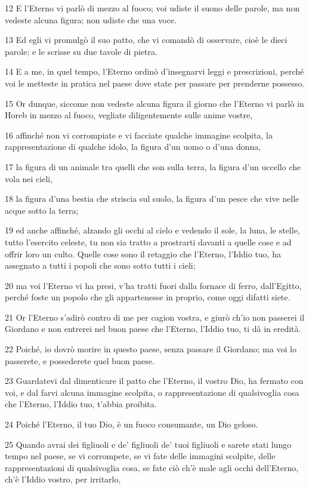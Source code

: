 \par 12 E l'Eterno vi parlò di mezzo al fuoco; voi udiste il suono delle parole, ma non vedeste alcuna figura; non udiste che una voce.
\par 13 Ed egli vi promulgò il suo patto, che vi comandò di osservare, cioè le dieci parole; e le scrisse su due tavole di pietra.
\par 14 E a me, in quel tempo, l'Eterno ordinò d'insegnarvi leggi e prescrizioni, perché voi le metteste in pratica nel paese dove state per passare per prenderne possesso.
\par 15 Or dunque, siccome non vedeste alcuna figura il giorno che l'Eterno vi parlò in Horeb in mezzo al fuoco, vegliate diligentemente sulle anime vostre,
\par 16 affinché non vi corrompiate e vi facciate qualche immagine scolpita, la rappresentazione di qualche idolo, la figura d'un uomo o d'una donna,
\par 17 la figura di un animale tra quelli che son sulla terra, la figura d'un uccello che vola nei cieli,
\par 18 la figura d'una bestia che striscia sul suolo, la figura d'un pesce che vive nelle acque sotto la terra;
\par 19 ed anche affinché, alzando gli occhi al cielo e vedendo il sole, la luna, le stelle, tutto l'esercito celeste, tu non sia tratto a prostrarti davanti a quelle cose e ad offrir loro un culto. Quelle cose sono il retaggio che l'Eterno, l'Iddio tuo, ha assegnato a tutti i popoli che sono sotto tutti i cieli;
\par 20 ma voi l'Eterno vi ha presi, v'ha tratti fuori dalla fornace di ferro, dall'Egitto, perché foste un popolo che gli appartenesse in proprio, come oggi difatti siete.
\par 21 Or l'Eterno s'adirò contro di me per cagion vostra, e giurò ch'io non passerei il Giordano e non entrerei nel buon paese che l'Eterno, l'Iddio tuo, ti dà in eredità.
\par 22 Poiché, io dovrò morire in questo paese, senza passare il Giordano; ma voi lo passerete, e possederete quel buon paese.
\par 23 Guardatevi dal dimenticare il patto che l'Eterno, il vostro Dio, ha fermato con voi, e dal farvi alcuna immagine scolpita, o rappresentazione di qualsivoglia cosa che l'Eterno, l'Iddio tuo, t'abbia proibita.
\par 24 Poiché l'Eterno, il tuo Dio, è un fuoco consumante, un Dio geloso.
\par 25 Quando avrai dei figliuoli e de' figliuoli de' tuoi figliuoli e sarete stati lungo tempo nel paese, se vi corrompete, se vi fate delle immagini scolpite, delle rappresentazioni di qualsivoglia cosa, se fate ciò ch'è male agli occhi dell'Eterno, ch'è l'Iddio vostro, per irritarlo,
